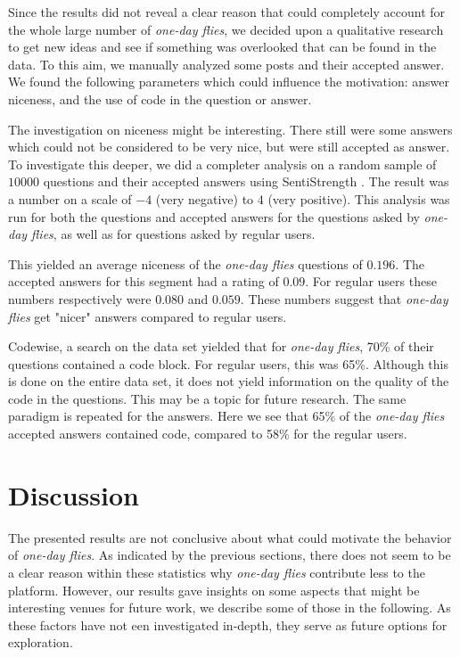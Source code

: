 \documentclass[conference]{IEEEtran}
\newcommand\odf{\emph{one-day flies}\xspace}
\newcommand\ru{regular users\xspace}
\begin{document}
Since the results did not reveal a clear reason that could completely account
for the whole large number of \odf, we decided upon a qualitative 
research to get new ideas and see if something was overlooked that can be found
in the data. To this aim, we manually analyzed some posts and their
accepted answer. We found the following parameters which could influence the
motivation: answer niceness, and the use of code in the question or answer.

The investigation on niceness might be interesting. There still were some answers
which could not be considered to be very nice, but were still accepted as answer.
To investigate this deeper, we did a completer analysis on a random sample of
$10000$ questions and their accepted answers using SentiStrength \cite{thelwall2010sentiment}.
The result was a number on a scale of $-4$ (very negative) to $4$ (very positive).
This analysis was run for both the questions and accepted answers for the questions
asked by \odf, as well as for questions asked by \ru.

This yielded an average niceness of the \odf questions of $0.196$. The accepted
answers for this segment had a rating of $0.09$. For \ru these numbers respectively
were $0.080$ and $0.059$. These numbers suggest that \odf get "nicer" answers
compared to regular users.



Codewise, a search on the data set yielded that for \odf, 70\% of their questions contained
a code block. For \ru, this was 65\%. Although this is done on the entire data set,
it does not yield information on the quality of the code in the questions. This
may be a topic for future research.
The same paradigm is repeated for the answers. Here we see that 65\% of the \odf
accepted answers contained code, compared to 58\% for the \ru.

\section{Discussion} \label{NewResearchQuestions}




The presented results are not conclusive about what could motivate the behavior
of \odf. As indicated by the previous sections, there does not seem to be a clear reason
within these statistics why \odf contribute less to the platform.  However, our
results gave insights on some aspects that might be interesting venues for
future work, we describe some of those in the following. As these factors have not
een investigated in-depth, they serve as future options for exploration.
\end{document}
